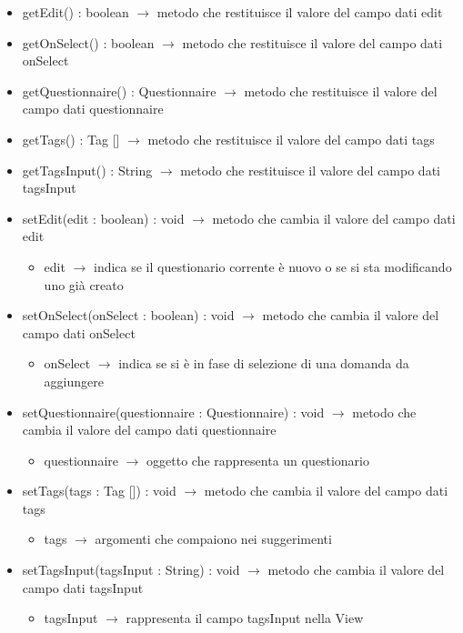 \begin{description}
\begin{itemize}
	\item getEdit() : boolean $\rightarrow$ metodo che restituisce il valore del campo dati edit
	\item getOnSelect() : boolean $\rightarrow$ metodo che restituisce il valore del campo dati onSelect
	\item getQuestionnaire() : Questionnaire $\rightarrow$ metodo che restituisce il valore del campo dati questionnaire
	\item getTags() : Tag [] $\rightarrow$ metodo che restituisce il valore del campo dati tags
	\item getTagsInput() : String $\rightarrow$ metodo che restituisce il valore del campo dati tagsInput
	\item setEdit(edit : boolean) : void $\rightarrow$ metodo che cambia il valore del campo dati edit\begin{itemize}
		\item edit $\rightarrow$ indica se il questionario corrente è nuovo o se si sta modificando uno già creato
	\end{itemize}
	
	\item setOnSelect(onSelect : boolean) : void $\rightarrow$ metodo che cambia il valore del campo dati onSelect\begin{itemize}
		\item onSelect $\rightarrow$ indica se si è in fase di selezione di una domanda da aggiungere
	\end{itemize}
	
	\item setQuestionnaire(questionnaire : Questionnaire) : void $\rightarrow$ metodo che cambia il valore del campo dati questionnaire\begin{itemize}
		\item questionnaire $\rightarrow$ oggetto che rappresenta un questionario
	\end{itemize}
	
	\item setTags(tags : Tag []) : void $\rightarrow$ metodo che cambia il valore del campo dati tags\begin{itemize}
		\item tags $\rightarrow$ argomenti che compaiono nei suggerimenti
	\end{itemize}
	
	\item setTagsInput(tagsInput : String) : void $\rightarrow$ metodo che cambia il valore del campo dati tagsInput\begin{itemize}
		\item tagsInput $\rightarrow$ rappresenta il campo tagsInput nella View
	\end{itemize}
	
\end{itemize}

\end{description}

